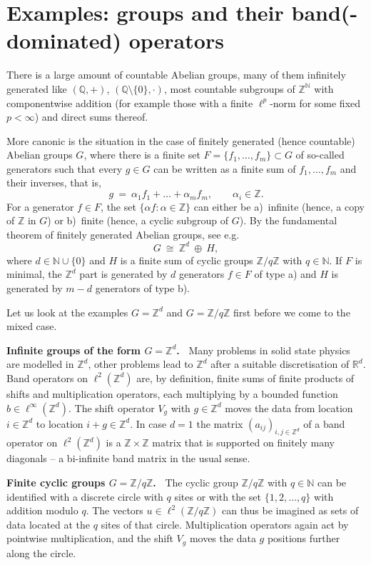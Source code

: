 \documentclass{article}
\newcommand\N{{\mathbb N}}
\newcommand\Q{{\mathbb Q}}
\newcommand\R{{\mathbb R}}
\newcommand\Z{{\mathbb Z}}
\numberwithin{equation}{section}   %
\numberwithin{figure}{section}  %
\begin{document}
\section{Examples: groups and their band(-dominated) operators} \label{sec:ex}
There is a large amount of countable Abelian groups, many of them infinitely generated like $(\Q,+)$, $(\Q\setminus\{0\},\cdot)$, most countable subgroups of $\Z^\N$ with componentwise addition (for example those with a finite $\ell^p$-norm for some fixed $p<\infty$) and direct sums thereof.

More canonic is the situation in the case of finitely generated (hence countable) Abelian groups $G$, where there is a finite set $F=\{f_1,\dots,f_m\}\subset G$ of so-called generators such that every $g\in G$ can be written as a finite sum of $f_1,\dots,f_m$ and their inverses, that is,
\[
g\ =\ \alpha_1f_1+\dots+\alpha_m f_m,\qquad \alpha_i\in\Z.
\]
For a generator $f\in F$, the set $\{\alpha f:\alpha\in\Z\}$ can either be a)~infinite (hence, a copy of $\Z$ in $G$) or b)~finite (hence, a cyclic subgroup of $G$). By the fundamental theorem of finitely generated Abelian groups, see e.g.~\cite[\S 9.7]{Cohn}
\begin{equation} \label{eq:fundthm}
G\ \cong\ \Z^d\ \oplus\ H,
\end{equation}
where $d\in\N\cup\{0\}$ and $H$ is a finite sum of cyclic groups $\Z/q\Z$ with $q\in\N$. If $F$ is minimal, the $\Z^d$ part is generated by $d$ generators $f\in F$ of type a) and $H$ is generated by $m-d$ generators of type b).

Let us look at the examples $G=\Z^d$ and $G=\Z/q\Z$ first before we come to the mixed case.


\medskip\noindent
{\bf Infinite groups of the form $G=\Z^d$.\ }
Many problems in solid state physics are modelled in $\Z^d$, other problems lead to $\Z^d$ after a suitable discretisation of $\R^d$. Band operators on $\ell^2(\Z^d)$ are, by definition, finite sums of finite products of shifts and multiplication operators, each multiplying by a bounded function $b\in\ell^\infty(\Z^d)$. The shift operator $V_g$ with $g\in\Z^d$ moves the data from location $i\in\Z^d$ to location $i+g\in\Z^d$. In case $d=1$ the matrix $(a_{ij})_{i,j\in\Z^d}$ of a band operator on $\ell^2(\Z^d)$ is a $\Z\times\Z$ matrix that is supported on finitely many diagonals -- a bi-infinite band matrix in the usual sense.


\medskip\noindent
{\bf Finite cyclic groups $G=\Z/q\Z$.\ } The cyclic group $\Z/q\Z$ with $q\in\N$ can be identified with a discrete circle with $q$ sites or with the set $\{1,2,\dots,q\}$ with addition modulo $q$. The vectors $u\in\ell^2(\Z/q\Z)$ can thus be imagined as sets of data located at the $q$ sites of that circle. Multiplication operators again act by pointwise multiplication, and the shift $V_g$ moves the data $g$ positions further along the circle.
\end{document}
